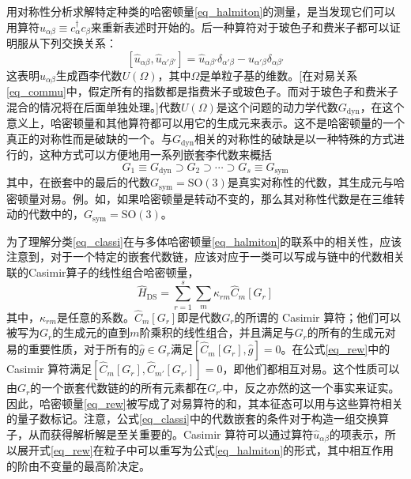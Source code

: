 用对称性分析求解特定种类的哈密顿量\ref{eq_halmiton}的测量，是当发现它们可以用算符$\widehat{u}_{\alpha\beta}\equiv c_{\alpha}^\dag c_\beta$来重新表述时开始的。后一种算符对于玻色子和费米子都可以证明服从下列交换关系：
\begin{equation}\label{eq_commu}
[\widehat{u}_{\alpha\beta},\widehat{u}_{\alpha'\beta'}]=\widehat{u}_{\alpha\beta'}\delta_{\alpha'\beta}-\widehat{u}_{\alpha'\beta}\delta_{\alpha\beta'}
\end{equation}
这表明$\widehat{u}_{\alpha\beta}$生成酉李代数$U(\Omega)$，其中$\Omega$是单粒子基的维数。[在对易关系\ref{eq_commu}中，假定所有的指数都是指费米子或玻色子。而对于玻色子和费米子混合的情况将在后面单独处理。]代数$U(\Omega)$是这个问题的动力学代数$G_\textrm{dyn}$，在这个意义上，哈密顿量和其他算符都可以用它的生成元来表示。这不是哈密顿量的一个真正的对称性而是破缺的一个。与$G_\textrm{dyn}$相关的对称性的破缺是以一种特殊的方式进行的，这种方式可以方便地用一系列嵌套李代数来概括
\begin{equation}\label{eq_classi}
G_1\equiv G_\textrm{dyn}\supset G_2\supset\cdots\supset G_s\equiv G_\textrm{sym}
\end{equation}
其中，在嵌套中的最后的代数$G_\textrm{sym}=\textrm{SO}(3)$是真实对称性的代数，其生成元与哈密顿量对易。例。如，如果哈密顿量是转动不变的，那么其对称性代数是在三维转动的代数中的，$G_\textrm{sym}=\textrm{SO}(3)$。

为了理解分类\ref{eq_classi}在与多体哈密顿量\ref{eq_halmiton}的联系中的相关性，应该注意到，对于一个特定的嵌套代数链，应该对应于一类可以写成与链中的代数相关联的Casimir算子的线性组合哈密顿量，
\begin{equation}\label{eq_rew}
\widehat{H}_\textrm{DS}=\sum_{r=1}^s\sum_m\kappa_{rm}\widehat{C}_m[G_r]
\end{equation}
其中，$\kappa_{rm}$是任意的系数。$\widehat{C}_m[G_r]$即是代数$G_r$的所谓的 Casimir 算符；他们可以被写为$G_r$的生成元的直到$m$阶乘积的线性组合，并且满足与$G_r$的所有的生成元对易的重要性质，对于所有的$\widehat{g}\in G_r$满足$[\widehat{C}_m[G_r],\widehat{g}]=0$。在公式\ref{eq_rew}中的 Casimir 算符满足$[\widehat{C}_m[G_r],\widehat{C}_{m'}[G_{r'}]]=0$，即他们都相互对易。这个性质可以由$G_r$的一个嵌套代数链的的所有元素都在$G_{r'}$中，反之亦然的这一个事实来证实。因此，哈密顿量\ref{eq_rew}被写成了对易算符的和，其本征态可以用与这些算符相关的量子数标记。注意，公式\ref{eq_classi}中的代数嵌套的条件对于构造一组交换算子，从而获得解析解是至关重要的。Casimir 算符可以通过算符$\widehat{u}_{\alpha\beta}$的项表示，所以展开式\ref{eq_rew}在粒子中可以重写为公式\ref{eq_halmiton}的形式，其中相互作用的阶由不变量的最高阶决定。


